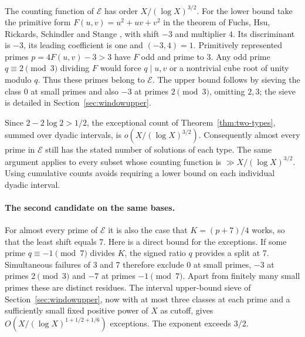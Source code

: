 \documentclass[a4paper,11pt]{article}
\begin{document}
The counting function of $\mathcal E$ has order $X/(\log X)^{3/2}$. For the lower bound take the primitive form $F(u,v)=u^2+uv+v^2$ in the theorem of Fuchs, Hsu, Rickards, Schindler and Stange \cite[Theorem 1.1]{forms}, with shift $-3$ and multiplier $4$. Its discriminant is $-3$, its leading coefficient is one and $(-3,4)=1$. Primitively represented primes $p=4F(u,v)-3>3$ have $F$ odd and prime to $3$. Any odd prime $q\equiv2\pmod3$ dividing $F$ would force $q\mid u,v$ or a nontrivial cube root of unity modulo $q$. Thus these primes belong to $\mathcal E$. The upper bound follows by sieving the class $0$ at small primes and also $-3$ at primes $2\pmod3$, omitting $2,3$; the sieve is detailed in Section~\ref{sec:windowupper}.

Since $2-2\log 2>1/2$, the exceptional count of Theorem~\ref{thm:two-types}, summed over dyadic intervals, is $o(X/(\log X)^{3/2})$. Consequently almost every prime in $\mathcal E$ still has the stated number of solutions of each type. The same argument applies to every subset whose counting function is $\gg X/(\log X)^{3/2}$. Using cumulative counts avoids requiring a lower bound on each individual dyadic interval.

\paragraph{The second candidate on the same bases.}
For almost every prime of $\mathcal E$ it is also the case that $K=(p+7)/4$ works, so that the least shift equals 7. Here is a direct bound for the exceptions. If some prime $q\equiv-1\pmod7$ divides $K$, the signed ratio $q$ provides a split at 7. Simultaneous failures of 3 and 7 therefore exclude $0$ at small primes, $-3$ at primes $2\pmod3$ and $-7$ at primes $-1\pmod7$. Apart from finitely many small primes these are distinct residues. The interval upper-bound sieve of Section~\ref{sec:windowupper}, now with at most three classes at each prime and a sufficiently small fixed positive power of $X$ as cutoff, gives $O(X/(\log X)^{1+1/2+1/6})$ exceptions. The exponent exceeds $3/2$.
\end{document}
